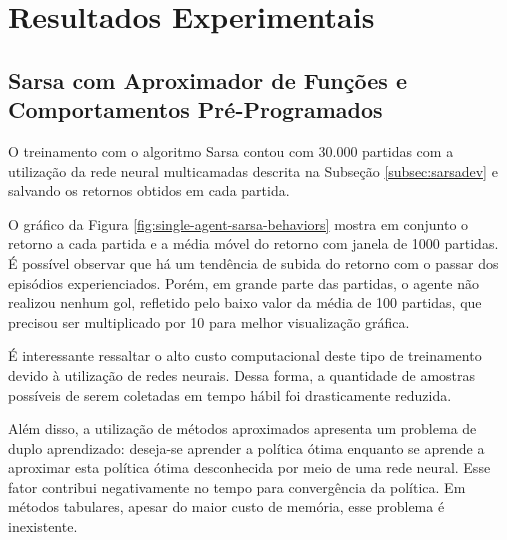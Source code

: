 \chapter{Resultados Experimentais}
\label{chap:Resultados}





\section{Sarsa com Aproximador de Funções e Comportamentos Pré-Programados}

O treinamento com o algoritmo Sarsa contou com 30.000 partidas com a utilização da rede neural multicamadas descrita na Subseção \ref{subsec:sarsadev} e salvando os retornos obtidos em cada partida.

O gráfico da Figura \ref{fig:single-agent-sarsa-behaviors} mostra em conjunto o retorno a cada partida e a média móvel do retorno com janela de 1000 partidas. É possível observar que há um tendência de subida do retorno com o passar dos episódios experienciados. Porém, em grande parte das partidas, o agente não realizou nenhum gol, refletido pelo baixo valor da média de 100 partidas, que precisou ser multiplicado por 10 para melhor visualização gráfica.

É interessante ressaltar o alto custo computacional deste tipo de treinamento devido à utilização de redes neurais. Dessa forma, a quantidade de amostras possíveis de serem coletadas em tempo hábil foi drasticamente reduzida.

Além disso, a utilização de métodos aproximados apresenta um problema de duplo aprendizado: deseja-se aprender a política ótima enquanto se aprende a aproximar esta política ótima desconhecida por meio de uma rede neural. Esse fator contribui negativamente no tempo para convergência da política. Em métodos tabulares, apesar do maior custo de memória, esse problema é inexistente.


